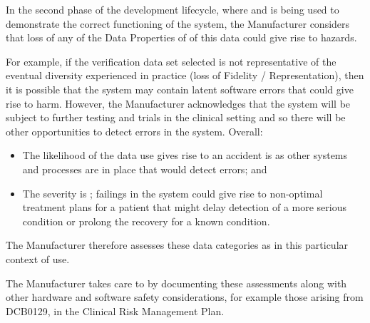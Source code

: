 In the second phase of the development lifecycle, where  and  is being used to demonstrate the correct functioning of the system, the Manufacturer considers that loss of any of the Data Properties of  of this data could give rise to hazards.

For example, if the verification data set selected is not representative of the eventual diversity experienced in practice (loss of Fidelity / Representation), then it is possible that the system may contain latent software errors that could give rise to harm. However, the Manufacturer acknowledges that the system will be subject to further testing and trials in the clinical setting and so there will be other opportunities to detect errors in the system. Overall:
\begin{itemize}
  \item The likelihood of the data use gives rise to an accident is  as other systems and processes are in place that would detect errors; and
  \item The severity is ; failings in the system could give rise to non-optimal treatment plans for a patient that might delay detection of a more serious condition or prolong the recovery for a known condition.
\end{itemize}

The Manufacturer therefore assesses these data categories as  in this particular context of use.

The Manufacturer takes care to  by documenting these assessments along with other hardware and software safety considerations, for example those arising from
DCB0129,
in the Clinical Risk Management Plan.

